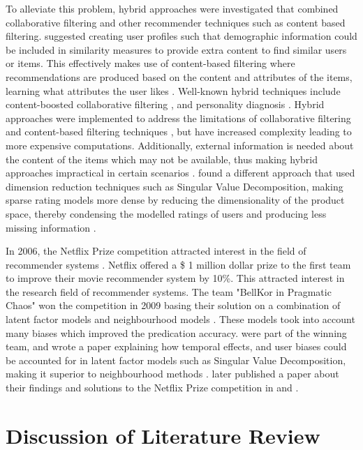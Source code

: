 To alleviate this problem, hybrid approaches were investigated that combined collaborative filtering and other recommender techniques such as content based filtering. \citeauthor{toward} suggested creating user profiles such that demographic information could be included in similarity measures to provide extra content to find similar users or items. This effectively makes use of content-based filtering where recommendations are produced based on the content and attributes of the items, learning what attributes the user likes \cite{toward}. Well-known hybrid techniques include content-boosted collaborative filtering \cite{hybrid}, and personality diagnosis \cite{hybrid2, survey}. Hybrid approaches were implemented to address the limitations of collaborative filtering and content-based filtering techniques \cite{toward}, but have increased complexity leading to more expensive computations. Additionally, external information is needed about the content of the items which may not be available, thus making hybrid approaches impractical in certain scenarios \cite{survey}. \citeauthor{dimension} found a different approach that used dimension reduction techniques such as Singular Value Decomposition, making sparse rating models more dense by reducing the dimensionality of the product space, thereby condensing the modelled ratings of users and producing less missing information \cite{dimension}. 

In 2006, the Netflix Prize competition attracted interest in the field of recommender systems \cite{survey}. Netflix offered a \$ 1 million dollar prize to the first team to improve their movie recommender system by 10\%. This attracted interest in the research field of recommender systems. The team "BellKor in Pragmatic Chaos" won the competition in 2009 basing their solution on a combination of latent factor models and neighbourhood models \cite{winning, survey}. These models took into account many biases which improved the predication accuracy. \citeauthor{koren2009matrix} were part of the winning team, and wrote a paper explaining how temporal effects, and user biases could be accounted for in latent factor models such as Singular Value Decomposition, making it superior to neighbourhood methods \cite{koren2009matrix}. \citeauthor{koren2011} later published a paper about their findings and solutions to the Netflix Prize competition in \cite{koren2011} and \cite{winners}.


\section{Discussion of Literature Review}

